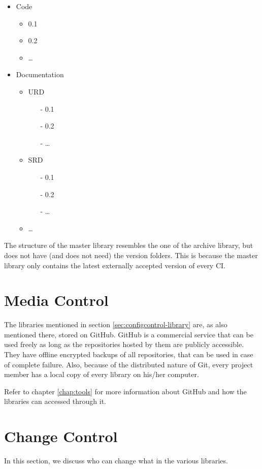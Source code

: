 \begin{itemize}
	\item Code
	\begin{itemize}
		\item 0.1
		\item 0.2
		\item \dots
	\end{itemize}
	\item Documentation
	\begin{itemize}
		\item URD
		\begin{itemize}
			\item[-] 0.1
			\item[-] 0.2
			\item[-] \dots
		\end{itemize}
		\item SRD
		\begin{itemize}
			\item[-] 0.1
			\item[-] 0.2
			\item[-] \dots
		\end{itemize}
		\item \dots
	\end{itemize}
\end{itemize}

The structure of the master library resembles the one of the archive library, but does not have (and does not need) the version folders. This is because the master library only contains the latest externally accepted version of every CI.

\section{Media Control}
\label{sec:configcontrol-media}
The libraries mentioned in section \ref{sec:configcontrol-library} are, as also mentioned there, stored on GitHub. GitHub is a commercial service that can be used freely as long as the repositories hosted by them are publicly accessible. They have offline encrypted backups of all repositories, that can be used in case of complete failure. Also, because of the distributed nature of Git, every project member has a local copy of every library on his/her computer.

Refer to chapter \ref{chap:tools} for more information about GitHub and how the libraries can accessed through it.

\section{Change Control}
In this section, we discuss who can change what in the various libraries.

